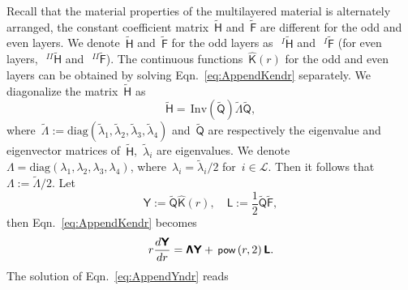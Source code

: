 \documentclass[preprint,12pt,times]{elsarticle}
\numberwithin{equation}{section}
\renewcommand{\u}[1]{\boldsymbol{#1}}
\newcommand{\usf}[1]{\u{\mathsf #1}}
\newcommand{\pr}[1]{\left( #1 \right)}
\newcommand{\p}{\,\textsf{\small pow}}
\newcommand{\Inv}{\,\mathrm{Inv}}
\renewcommand{\>}{$\Rightarrow$}
\begin{document}
Recall that the material properties of the multilayered material is alternately arranged, the constant coefficient matrix~$\tilde{\usf{H}}$ and~$\tilde{\usf{F}}$ are different for the odd and even layers. We denote~$\tilde{\usf{H}}$ and~$\tilde{\usf{F}}$ for the odd layers as~$~^{I}\tilde{\usf{H}}$ and~$~^{I}\tilde{\usf{F}}$ (for even layers,~$~^{II}\tilde{\usf{H}}$ and~$~^{II}\tilde{\usf{F}}$).
The continuous functions~$\hat{\usf{K}}(r)$ for the odd and even layers can be obtained by solving Eqn.~\eqref{eq:AppendKendr} separately. We diagonalize the matrix~$\tilde{\usf{H}}$ as
\begin{equation}
    \tilde{\usf{H}} = \Inv\pr{\tilde{\usf{Q}}} \tilde{\usf{\Lambda}} \tilde{\usf{Q}},
\end{equation}
where~$\tilde{\usf{\Lambda}} := \text{diag}(\tilde{\lambda}_1,\tilde{\lambda}_2,\tilde{\lambda}_3,\tilde{\lambda}_4)$ and~$\tilde{\usf{Q}}$ are respectively the eigenvalue and eigenvector matrices of~$\tilde{\usf{H}}$,~$\tilde{\lambda}_i$ are eigenvalues. We denote~$\usf{\Lambda}= \text{diag}(\lambda_1,\lambda_2,\lambda_3,\lambda_4)$, where~$\lambda_i = \tilde{\lambda}_i/2$ for~$i \in \mathcal{L}$. Then it follows that~$\usf{\Lambda} := \tilde{\usf{\Lambda}}/2$.
Let
\begin{equation}
	\usf{Y} := \tilde{\usf{Q}} \hat{\usf{K}}(r), \quad \usf{L} := \frac{1}{2}\tilde{\usf{Q}} \tilde{\usf{F}},
\end{equation}
then Eqn.~\eqref{eq:AppendKendr} becomes
\begin{equation}
	r \frac{d\usf{Y}}{dr} = \usf{\Lambda} \usf{Y} + \p\pr{r,2} \usf{L}.
	\label{eq:AppendYndr}
\end{equation}
The solution of Eqn.~\eqref{eq:AppendYndr} reads
\end{document}

